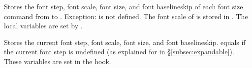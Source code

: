 \documentclass{beery}
\begin{document}
\begin{displaycode}
  \nopagebreak\newline
  \newline
  \nopagebreak\newline
\end{displaycode}

Stores the font step, font scale, font size, and font baselineskip of each font size command from  to .
Exception:
 is not defined.
The font scale of  is stored in .
The local variables are set by .

\begin{displaycode}
  \nopagebreak\newline
  \newline
  \nopagebreak\newline
\end{displaycode}

Stores the current font step, font scale, font size, and font baselineskip.
 equals  if the current font step is undefined (as explained for  in \S\ref{subsec:expandable}).
These variables are set in the  hook.
\end{document}
